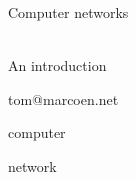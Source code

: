 \documentclass[t,12pt,aspectratio=169]{beamer}
\newcommand{\maketitleframe}[2][]{
   \begin{frame}[c]
      \centering
      {\Huge #2\\~}
      
      #1
      \end{frame}
}
\newcommand{\makewordframe}[1]{
   \begin{frame}[c]
      \centering
      {\Huge #1}
   \end{frame}
}
\begin{document}
\maketitleframe[An introduction]{Computer networks}
\makewordframe{tom@marcoen.net}
\makewordframe{computer}
\makewordframe{network}
\end{document}
